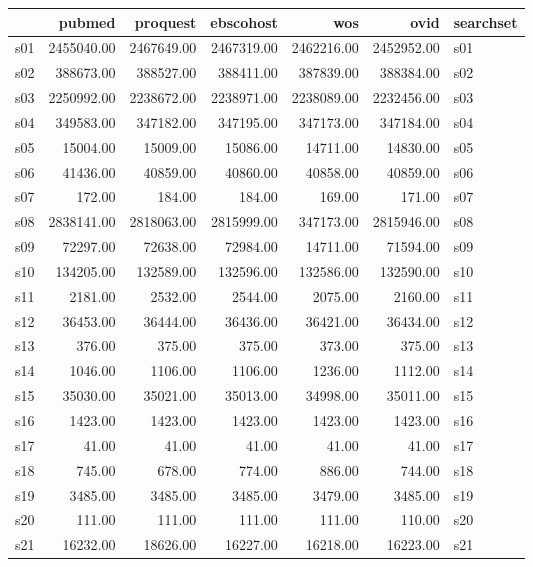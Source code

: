 \begin{table}[ht]
\centering
\begin{tabular}{rrrrrrl}
  \hline
 & pubmed & proquest & ebscohost & wos & ovid & searchset \\ 
  \hline
s01 & 2455040.00 & 2467649.00 & 2467319.00 & 2462216.00 & 2452952.00 & s01 \\ 
  s02 & 388673.00 & 388527.00 & 388411.00 & 387839.00 & 388384.00 & s02 \\ 
  s03 & 2250992.00 & 2238672.00 & 2238971.00 & 2238089.00 & 2232456.00 & s03 \\ 
  s04 & 349583.00 & 347182.00 & 347195.00 & 347173.00 & 347184.00 & s04 \\ 
  s05 & 15004.00 & 15009.00 & 15086.00 & 14711.00 & 14830.00 & s05 \\ 
  s06 & 41436.00 & 40859.00 & 40860.00 & 40858.00 & 40859.00 & s06 \\ 
  s07 & 172.00 & 184.00 & 184.00 & 169.00 & 171.00 & s07 \\ 
  s08 & 2838141.00 & 2818063.00 & 2815999.00 & 347173.00 & 2815946.00 & s08 \\ 
  s09 & 72297.00 & 72638.00 & 72984.00 & 14711.00 & 71594.00 & s09 \\ 
  s10 & 134205.00 & 132589.00 & 132596.00 & 132586.00 & 132590.00 & s10 \\ 
  s11 & 2181.00 & 2532.00 & 2544.00 & 2075.00 & 2160.00 & s11 \\ 
  s12 & 36453.00 & 36444.00 & 36436.00 & 36421.00 & 36434.00 & s12 \\ 
  s13 & 376.00 & 375.00 & 375.00 & 373.00 & 375.00 & s13 \\ 
  s14 & 1046.00 & 1106.00 & 1106.00 & 1236.00 & 1112.00 & s14 \\ 
  s15 & 35030.00 & 35021.00 & 35013.00 & 34998.00 & 35011.00 & s15 \\ 
  s16 & 1423.00 & 1423.00 & 1423.00 & 1423.00 & 1423.00 & s16 \\ 
  s17 & 41.00 & 41.00 & 41.00 & 41.00 & 41.00 & s17 \\ 
  s18 & 745.00 & 678.00 & 774.00 & 886.00 & 744.00 & s18 \\ 
  s19 & 3485.00 & 3485.00 & 3485.00 & 3479.00 & 3485.00 & s19 \\ 
  s20 & 111.00 & 111.00 & 111.00 & 111.00 & 110.00 & s20 \\ 
  s21 & 16232.00 & 18626.00 & 16227.00 & 16218.00 & 16223.00 & s21 \\ 

\end{tabular}
\end{table}
